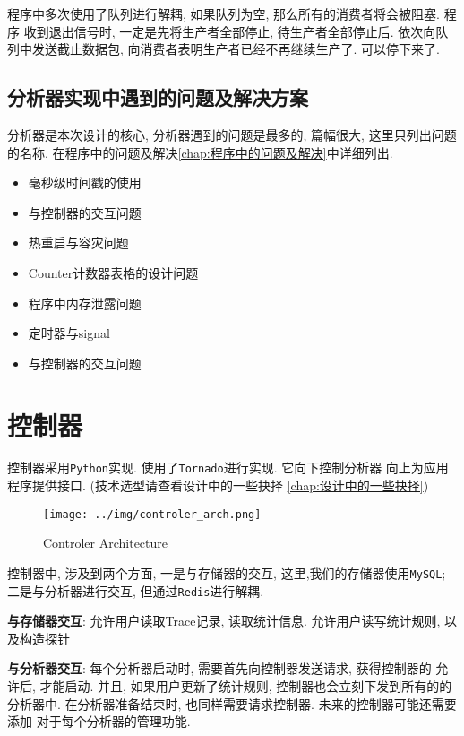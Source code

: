 程序中多次使用了队列进行解耦, 如果队列为空, 那么所有的消费者将会被阻塞.
程序 收到退出信号时, 一定是先将生产者全部停止, 待生产者全部停止后.
依次向队列中发送截止数据包, 向消费者表明生产者已经不再继续生产了.
可以停下来了.

\subsection{分析器实现中遇到的问题及解决方案}

分析器是本次设计的核心, 分析器遇到的问题是最多的, 篇幅很大,
这里只列出问题的名称. 在程序中的问题及解决\ref{chap:程序中的问题及解决}中详细列出.

\begin{itemize}
\item
  毫秒级时间戳的使用
\item
  与控制器的交互问题
\item
  热重启与容灾问题
\item
  Counter计数器表格的设计问题
\item
  程序中内存泄露问题
\item
  定时器与signal
\item
  与控制器的交互问题
\end{itemize}

\section{控制器}

控制器采用\texttt{Python}实现. 使用了\texttt{Tornado}进行实现. 它向下控制分析器
向上为应用程序提供接口. (技术选型请查看设计中的一些抉择
\ref{chap:设计中的一些抉择})


\begin{figure}[htbp!]
  \centering
  \texttt{[image: ../img/controler\_arch.png]}
  \caption{Controler Architecture}
  \label{fig:contoler_arch}
\end{figure}

控制器中, 涉及到两个方面, 一是与存储器的交互, 这里,我们的存储器使用\texttt{MySQL};
二是与分析器进行交互, 但通过\texttt{Redis}进行解耦.


\textbf{与存储器交互}: 允许用户读取Trace记录, 读取统计信息. 允许用户读写统计规则,
以及构造探针

\textbf{与分析器交互}: 每个分析器启动时, 需要首先向控制器发送请求, 获得控制器的
允许后, 才能启动. 并且, 如果用户更新了统计规则, 控制器也会立刻下发到所有的的
分析器中. 在分析器准备结束时, 也同样需要请求控制器. 未来的控制器可能还需要添加
对于每个分析器的管理功能.


